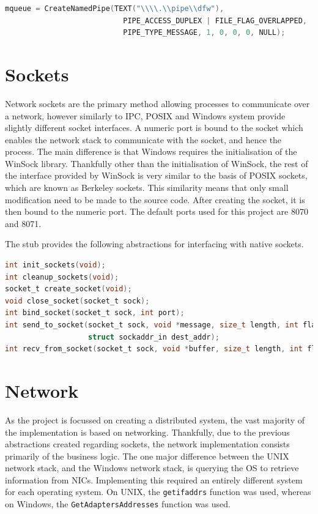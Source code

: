 \documentclass[a4paper, 11pt]{report}
\begin{document}
\begin{lstlisting}[language=c,style=c,caption=Creating the message queue on Windows]
mqueue = CreateNamedPipe(TEXT("\\\\.\\pipe\\dfw"),
                           PIPE_ACCESS_DUPLEX | FILE_FLAG_OVERLAPPED,
                           PIPE_TYPE_MESSAGE, 1, 0, 0, 0, NULL);
\end{lstlisting}

\section{Sockets}
Network sockets are the primary method allowing processes to communicate over a network, however similarly to \acrshort{IPC}, \acrshort{POSIX} and Windows system provide slightly different socket interfaces. A numeric port is bound to the socket which enables the network stack to communicate with the socket, and hence the process. The main difference is that Windows requires the initialisation of the WinSock\cite{winsock} library. Thankfully other than the initialisation of WinSock, the rest of the interface provided by WinSock is very similar to the basis of \acrshort{POSIX} sockets, which are known as Berkeley sockets. This similarity means that only small modification need to be made to the source code. After creating the socket, it is then bound to the numeric port. The default ports used for this project are 8070 and 8071.

The \gls{stub} provides the following abstractions for interfacing with native sockets.
\begin{lstlisting}[language=c,style=c,caption=Socket API]
int init_sockets(void);
int cleanup_sockets(void);
socket_t create_socket(void);
void close_socket(socket_t sock);
int bind_socket(socket_t sock, int port);
int send_to_socket(socket_t sock, void *message, size_t length, int flags,
                   struct sockaddr_in dest_addr);
int recv_from_socket(socket_t sock, void *buffer, size_t length, int flags);
\end{lstlisting}

\section{Network}
As the project is focussed on creating a distributed system, the vast majority of the implementation is based on networking. Thankfully, due to the previous abstractions created regarding sockets, the network implementation consists primarily of the business logic. The one major difference between the UNIX network stack, and the Windows network stack, is querying the \acrshort{OS} to retrieve information from \acrshort{NIC}s. Implementing this required an entirely different system for each operating system. On UNIX, the \texttt{getifaddrs} function was used, whereas on Windows, the \texttt{GetAdaptersAddresses} function was used.
\end{document}
